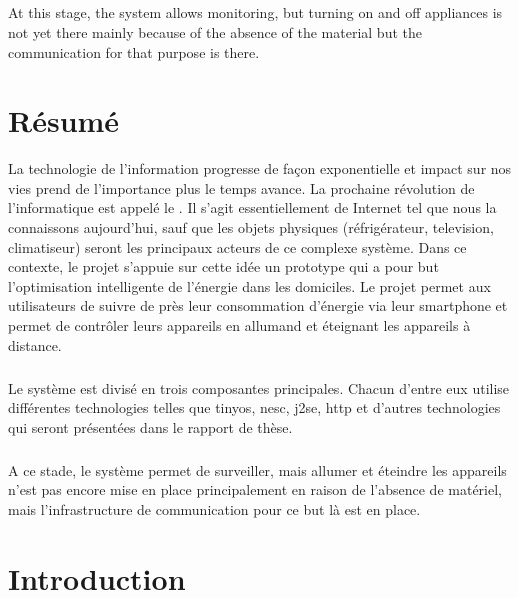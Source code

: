 \documentclass[oneside,12pt,a4paper,final]{book}
\begin{document}
\paragraph{}
At this stage, the system allows monitoring, but turning on and off appliances is not yet there mainly because of the absence of the material but the communication for that purpose is there.

\chapter{Résumé}
La technologie de l'information progresse de façon exponentielle et impact sur nos vies prend de l'importance plus le temps avance. La prochaine révolution de l'informatique est appelé le . Il s'agit essentiellement de Internet tel que nous la connaissons aujourd'hui, sauf que les objets physiques (réfrigérateur, television, climatiseur) seront les principaux acteurs de ce complexe système. Dans ce contexte, le projet s'appuie sur cette idée un prototype qui a pour but l'optimisation intelligente de l'énergie dans les domiciles. Le projet permet aux utilisateurs de suivre de près leur consommation d'énergie via leur smartphone et permet de contrôler leurs appareils en allumand et éteignant les appareils à distance.
\paragraph {}
Le système est divisé en trois composantes principales. Chacun d'entre eux  utilise différentes technologies telles que \gls{tinyos}, \gls{nesc}, \gls{j2se}, \gls{http} et d'autres technologies qui seront présentées dans le rapport de thèse.
\paragraph{}
A ce stade, le système permet de surveiller, mais allumer et éteindre les appareils n'est pas encore mise en place principalement en raison de l'absence de matériel, mais l'infrastructure de communication pour ce but là est en place.


\printglossaries

\tableofcontents


\mainmatter
\chapter{Introduction}
\end{document}
